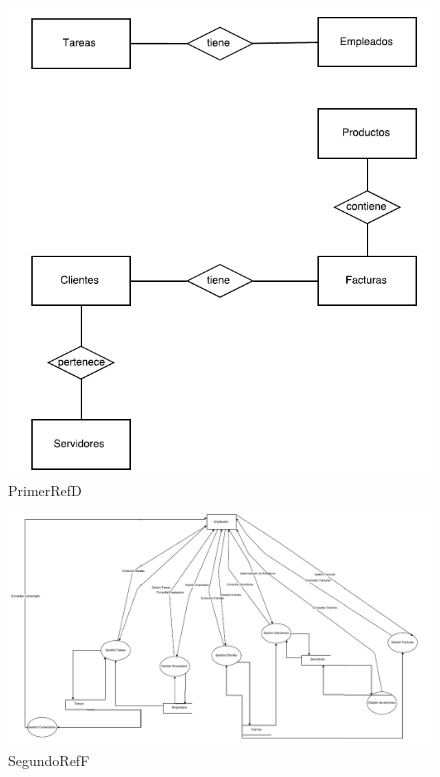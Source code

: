 \documentclass[paper=a4, fontsize=11pt, spanish]{scrartcl}
\begin{document}
\begin{figure}
	\includegraphics{PrimerRefD.png}
	\caption{PrimerRefD}
	\label{fig:PrimerRefD}
\end{figure}

\begin{figure}
	\includegraphics[width=1.25\textwidth]{SegundoRefF.png}
	\caption{SegundoRefF}
	\label{fig:SegundoRefF}
\end{figure}
\end{document}

